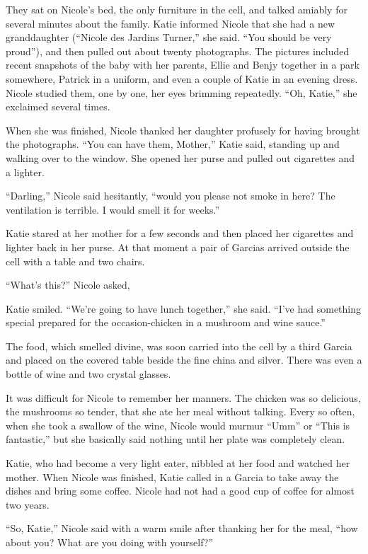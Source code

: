 \documentclass[]{article}
\begin{document}
{{They sat on Nicole’s bed, the only furniture in the cell, and talked amiably for several minutes about the family.  Katie informed Nicole that she had a new granddaughter (“Nicole des Jardins Turner,” she said.  “You should be very proud”), and then pulled out about twenty photographs.  The pictures included recent snapshots of the baby with her parents, Ellie and Benjy together in a park somewhere, Patrick in a uniform, and even a couple of Katie in an evening dress.  Nicole studied them, one by one, her eyes brimming repeatedly.  “Oh, Katie,” she exclaimed several times.

When she was finished, Nicole thanked her daughter profusely for having brought the photographs.  “You can have them, Mother,” Katie said, standing up and walking over to the window.  She opened her purse and pulled out cigarettes and a lighter.

“Darling,” Nicole said hesitantly, “would you please not smoke in here? The ventilation is terrible.  I would smell it for weeks.”

Katie stared at her mother for a few seconds and then placed her cigarettes and lighter back in her purse.  At that moment a pair of Garcias arrived outside the cell with a table and two chairs.

“What’s this?” Nicole asked,

Katie smiled.  “We’re going to have lunch together,” she said.  “I’ve had something special prepared for the occasion-chicken in a mushroom and wine sauce.”

The food, which smelled divine, was soon carried into the cell by a third Garcia and placed on the covered table beside the fine china and silver.  There was even a bottle of wine and two crystal glasses.

It was difficult for Nicole to remember her manners.  The chicken was so delicious, the mushrooms so tender, that she ate her meal without talking.  Every so often, when she took a swallow of the wine, Nicole would murmur “Umm” or “This is fantastic,” but she basically said nothing until her plate was completely clean.

Katie, who had become a very light eater, nibbled at her food and watched her mother.  When Nicole was finished, Katie called in a Garcia to take away the dishes and bring some coffee.  Nicole had not had a good cup of coffee for almost two years.

“So, Katie,” Nicole said with a warm smile after thanking her for the meal, “how about you? What are you doing with yourself?”

}}
\end{document}
